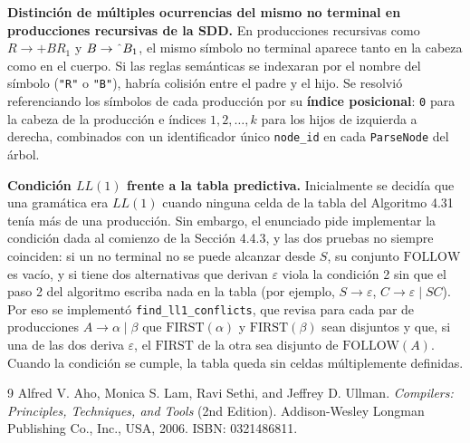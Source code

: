 \documentclass[11pt,a4paper]{article}
\begin{document}
\textbf{Distinci\'on de m\'ultiples ocurrencias del mismo no terminal en producciones recursivas de la SDD.} En producciones recursivas como $R \to + B R_1$ y $B \to \text{\^{}} B_1$, el mismo s\'imbolo no terminal aparece tanto en la cabeza como en el cuerpo. Si las reglas sem\'anticas se indexaran por el nombre del s\'imbolo (\texttt{"R"} o \texttt{"B"}), habr\'ia colisi\'on entre el padre y el hijo. Se resolvi\'o referenciando los s\'imbolos de cada producci\'on por su \textbf{\'indice posicional}: \texttt{0} para la cabeza de la producci\'on e \'indices $1, 2, \dots, k$ para los hijos de izquierda a derecha, combinados con un identificador \'unico \texttt{node\_id} en cada \texttt{ParseNode} del \'arbol.

\textbf{Condici\'on $LL(1)$ frente a la tabla predictiva.} Inicialmente se decid\'ia que una gram\'atica era $LL(1)$ cuando ninguna celda de la tabla del Algoritmo 4.31 ten\'ia m\'as de una producci\'on. Sin embargo, el enunciado pide implementar la condici\'on dada al comienzo de la Secci\'on 4.4.3, y las dos pruebas no siempre coinciden: si un no terminal no se puede alcanzar desde $S$, su conjunto $\text{FOLLOW}$ es vac\'io, y si tiene dos alternativas que derivan $\varepsilon$ viola la condici\'on 2 sin que el paso 2 del algoritmo escriba nada en la tabla (por ejemplo, $S \to \varepsilon$, $C \to \varepsilon \mid SC$). Por eso se implement\'o \texttt{find\_ll1\_conflicts}, que revisa para cada par de producciones $A \to \alpha \mid \beta$ que $\text{FIRST}(\alpha)$ y $\text{FIRST}(\beta)$ sean disjuntos y que, si una de las dos deriva $\varepsilon$, el $\text{FIRST}$ de la otra sea disjunto de $\text{FOLLOW}(A)$. Cuando la condici\'on se cumple, la tabla queda sin celdas m\'ultiplemente definidas.

\begin{thebibliography}{9}
Alfred V. Aho, Monica S. Lam, Ravi Sethi, and Jeffrey D. Ullman.
\textit{Compilers: Principles, Techniques, and Tools} (2nd Edition).
Addison-Wesley Longman Publishing Co., Inc., USA, 2006. ISBN: 0321486811.
\end{thebibliography}
\end{document}
